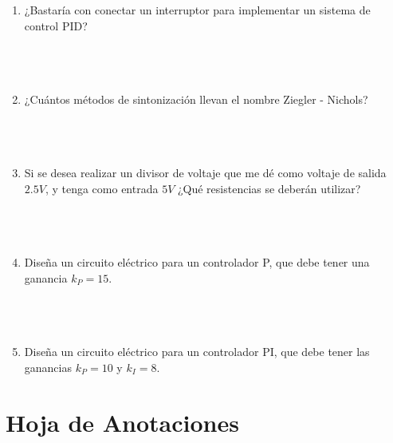 	\begin{enumerate}
		\item ¿Bastaría con conectar un interruptor para implementar un sistema de control PID? \\ \\ \\ \\
		\item ¿Cuántos métodos de sintonización llevan el nombre Ziegler - Nichols? \\ \\ \\ \\
		\item Si se desea realizar un divisor de voltaje que me dé como voltaje de salida $2.5 V$, y tenga como entrada $5 V$ ¿Qué resistencias se deberán utilizar? \\ \\ \\ \\
		\item Diseña un circuito eléctrico para un controlador P, que debe tener una ganancia $k_P = 15$. \\ \\ \\ \\
		\item Diseña un circuito eléctrico para un controlador PI, que debe tener las ganancias $k_P = 10$ y $k_I = 8$. \\
	\end{enumerate}


\clearpage
\section{Hoja de Anotaciones}

